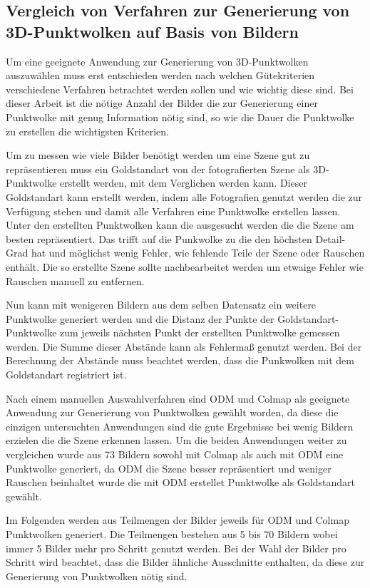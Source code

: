 \documentclass[12pt,titlepage, twoside]{article}
\begin{document}
\subsection{Vergleich von Verfahren zur Generierung von 3D-Punktwolken auf Basis von Bildern}

Um eine geeignete Anwendung zur Generierung von 3D-Punktwolken auszuwählen muss erst entschieden werden nach welchen Gütekriterien verschiedene Verfahren betrachtet werden sollen und wie wichtig diese sind.
Bei dieser Arbeit ist die nötige Anzahl der Bilder die zur Generierung einer Punktwolke mit genug Information nötig sind, so wie die Dauer die Punktwolke zu erstellen die wichtigsten Kriterien.

Um zu messen wie viele Bilder benötigt werden um eine Szene gut zu repräsentieren muss ein Goldstandart von der fotografierten Szene als 3D-Punktwolke erstellt werden, mit dem Verglichen werden kann.
Dieser Goldstandart kann erstellt werden, indem alle Fotografien genutzt werden die zur Verfügung stehen und damit alle Verfahren eine Punktwolke erstellen lassen. 
Unter den erstellten Punktwolken kann die ausgesucht werden die die Szene am besten repräsentiert. 
Das trifft auf die Punkwolke zu die den höchsten Detail-Grad hat und möglichst wenig Fehler, wie fehlende Teile der Szene oder Rauschen enthält.
Die so erstellte Szene sollte nachbearbeitet werden um etwaige Fehler wie Rauschen manuell zu entfernen.

Nun kann mit wenigeren Bildern aus dem selben Datensatz ein weitere Punktwolke generiert werden und die Distanz der Punkte der Goldstandart-Punktwolke zum jeweils nächsten Punkt der erstellten Punktwolke gemessen werden.
Die Summe dieser Abstände kann als Fehlermaß genutzt werden. Bei der Berechnung der Abstände muss beachtet werden, dass die Punkwolken mit dem Goldstandart registriert ist.

Nach einem manuellen Auswahlverfahren sind ODM und Colmap als geeignete Anwendung zur Generierung von Punktwolken gewählt worden, da diese die einzigen untersuchten Anwendungen sind die gute Ergebnisse bei wenig Bildern erzielen die die Szene erkennen lassen.
Um die beiden Anwendungen weiter zu vergleichen wurde aus 73 Bildern sowohl mit Colmap als auch mit ODM eine Punktwolke generiert, 
da ODM die Szene besser repräsentiert und weniger Rauschen beinhaltet wurde die mit ODM erstellet Punktwolke als Goldstandart gewählt. 

Im Folgenden werden aus Teilmengen der Bilder jeweils für ODM und Colmap Punktwolken generiert. Die Teilmengen bestehen aus 5 bis 70 Bildern wobei immer 5 Bilder mehr pro Schritt genutzt werden.
Bei der Wahl der Bilder pro Schritt wird beachtet, dass die Bilder ähnliche Ausschnitte enthalten, da diese zur Generierung von Punktwolken nötig sind.
\end{document}
